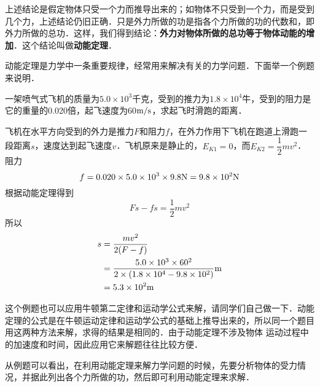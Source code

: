 上述结论是假定物体只受一个力而推导出来的；如物体不只受到一个力，而是受到几个力，上述结论仍旧正确．只是外力所做的功是指各个力所做的功的代数和，即外力所做的总功．这样，我们得到结论：\textbf{外力对物体所做的总功等于物体动能的增加}．这个结论叫做\textbf{动能定理}．

动能定理是力学中一条重要规律，经常用来解决有关的力学问题．下面举一个例题来说明．


\begin{example}
    一架喷气式飞机的质量为$5.0\times 10^3$千克，受到的推力为$1.8\times 10^4$牛，受到的阻力是它的重量的0.020倍，起飞速度为60$\text{m}/\text{s}$，求起飞时滑跑的距离．
\end{example}


\begin{solution}
    飞机在水平方向受到的外力是推力$F$和阻力$f$，在外力作用下飞机在跑道上滑跑一段距离$s$，速度达到起飞速度$v$．飞机原来是静止的，$E_{K1}=0$，而$E_{K2}=\dfrac{1}{2}mv^2$．阻力
    $$f=0.020\times 5.0\times 10^{3}\times 9.8{\rm N}=9.8\times 10^2{\rm N}$$
    根据动能定理得到
	\[Fs-fs=\frac{1}{2}mv^2 \]
    所以
    \[\begin{split}
        s&=\frac{mv^2}{2(F-f)}\\
&=\frac{5.0\times 10^{3}\times 60^2}{2\times (1.8\times 10^{4}-9.8\times 10^2)}{\rm m}\\
&=5.3\times 10^{2}{\rm m}
    \end{split}\]
	\end{solution}

    这个例题也可以应用牛顿第二定律和运动学公式来解，请同学们自己做一下．动能定理的公式是在牛顿运动定律和运动学公式的基础上推导出来的，所以同一个题目用这两种方法来解，求得的结果是相同的．由于动能定理不涉及物体
    运动过程中的加速度和时间，因此应用它来解题往往比较方便．

    从例题可以看出，在利用动能定理来解力学问题的时候，先要分析物体的受力情况，并据此列出各个力所做的功，然后即可利用动能定理来求解．
    
